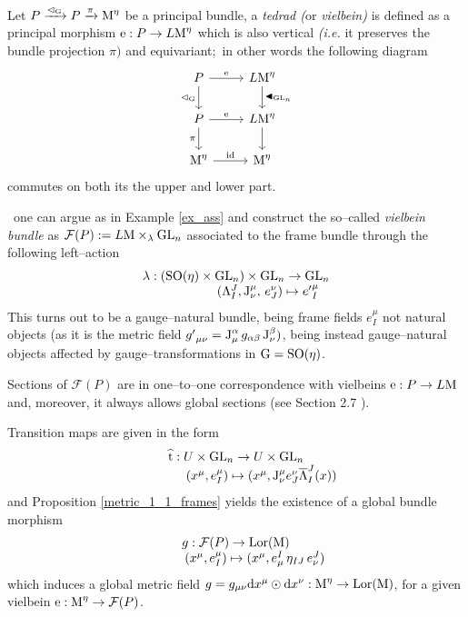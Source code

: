 \begin{defi}[Vielbein]
    Let $P\xrightarrow{\vartriangleleft_{\text{\normalfont G}}}P\xrightarrow{\pi}\text{\normalfont M}^\eta$ be a principal bundle, a \emph{tedrad (}or \emph{vielbein)} is defined as a principal morphism $\text{\normalfont e}:P\to L\text{\normalfont M}^\eta$ which is also vertical \emph{(i.e.} it preserves the bundle projection $\pi)$ and equivariant;\, in other words the following diagram
    \[\begin{tikzcd}
P\arrow{r}{\e} \arrow[swap]{d}{\vartriangleleft_{\G}} & L\M^\eta \arrow{d}{\blacktriangleleft_{\GL_n}} \\
P\arrow{r}{\e}\arrow[swap]{d}{\pi} & L\M^\eta\arrow[swap]{d} \\
\M^\eta\arrow{r}{\id} & \M^\eta
\end{tikzcd}
\]   
    commutes on both its the upper and lower part.
\end{defi}
\,\newline
one can argue as in Example \ref{ex_ass} and construct the so--called \emph{vielbein bundle} as $\mathcal{F}(P):=L\text{\normalfont M}\times_\lambda\text{\normalfont GL}_n$ associated to the frame bundle through the following left--action
$$\begin{matrix}
    \lambda:\left(\text{\normalfont SO}(\eta)\times\text{\normalfont GL}_n\right)\times\text{\normalfont GL}_n\to\text{\normalfont GL}_n\\
        \qquad\qquad\quad(\Lambda^J_I,\text{\normalfont J}^\mu_\nu,\,e^\nu_J)\mapsto {e'}^\mu_I
    \end{matrix}$$
This turns out to be a gauge--natural bundle, being frame fields $e^\mu_I$ not natural objects (as it is the metric field ${g'}_{\mu\nu}=\text{\normalfont J}_\mu^\alpha\,g_{\alpha\beta}\,\text{\normalfont J}^\beta_\nu)$, being instead gauge--natural objects affected by gauge--transformations in $\text{\normalfont G}=\text{\normalfont SO}(\eta)$.

Sections of $\mathcal{F}(P)$ are in one--to--one correspondence with vielbeins $\text{\normalfont e}:P\to L\text{\normalfont M}$ and, moreover, it always allows global sections (see Section 2.7 \cite{fatib}). %

Transition maps are given in the form
$$\begin{matrix}
    \widehat{\text{\normalfont t}}:U\times\text{\normalfont GL}_n\to U\times\text{\normalfont GL}_n\\
    \qquad\qquad(x^\mu,e^\mu_I)\mapsto(x^\mu,\text{\normalfont J}^\mu_\nu e^\nu_J\overline{\Lambda}^J_I(x))
\end{matrix}$$
and Proposition \ref{metric_1_1_frames} yields the existence of a global bundle morphism
$$\begin{matrix}
    g:\mathcal{F}(P)\to\text{\normalfont Lor}(\text{\normalfont M})\\
    \qquad\quad(x^\mu,e^\mu_I)\mapsto(x^\mu,e_\mu^I\,\eta_{IJ}\,e^J_\nu)
\end{matrix}$$
which induces a global metric field $g=g_{\mu\nu}\text{\normalfont d} x^\mu\odot\text{\normalfont d} x^\nu:\text{\normalfont M}^\eta\to\text{\normalfont Lor}(\text{\normalfont M})$, %
for a given vielbein $\text{\normalfont e}:\text{\normalfont M}^\eta\to\mathcal{F}(P)$.

